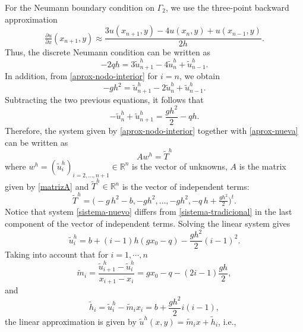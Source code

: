 \documentclass[axioms,article,submit,moreauthors]{Definitions/mdpi}
\newcommand\pder[2][]{\ensuremath{\tfrac{\partial#1}{\partial#2}}}
\begin{document}
For the Neumann boundary condition on $\Gamma_2$, we use the three-point backward \mbox{approximation}
\begin{equation}\label{aprox-Neumann-nueva}
\pder[u]{x}(x_{n+1},y)\approx \frac{3u(x_{n+1},y)-4u(x_n,y)+u(x_{n-1},y)}{2h}.
\end{equation}
Thus, the discrete Neumann condition can be written as
\begin{equation}
-2 q h = {
3\widetilde{u}^{h}_{n+1}
-4\widetilde{u}^{h}_{n}
+\widetilde{u}^{h}_{n-1}}.
\end{equation}
In addition, from \eqref{aprox-nodo-interior} for $i=n$, we obtain
\begin{equation}
-gh^2 = {\widetilde{u}^h_{n+1}-2\widetilde{u}^h_n+\widetilde{u}^h_{n-1}.}
\end{equation}
Subtracting the two previous equations, it follows that
\begin{equation}\label{aprox-nueva}
{-\widetilde{u}^h_n+\widetilde{u}^h_{n+1}}=\frac{gh^2}{2}-qh.
\end{equation}
Therefore, the system given by \eqref{aprox-nodo-interior} together with \eqref{aprox-nueva} can be written  as
\begin{equation}\label{sistema-nuevo}
{A w^h=\widetilde{T}^h}
\end{equation}
where $w^h = ({\widetilde{u}^h_i})_{i=2,\ldots,n+1}\in\mathbb{R}^{n}$ is the vector of unknowns, $A$ is the matrix given by \eqref{matrizA} and   ${\widetilde{T}^h}\in \mathbb{R}^n$ is the vector of independent terms:
    \begin{equation}\label{vectorT*}
     {\widetilde{T}^h}= \Big(-g\,h^2 - b, -g h^2, \ldots, -g h^2, -q\,h +\tfrac{gh^2}{2} \Big)^t.
\end{equation}
Notice that system \eqref{sistema-nuevo} differs from \eqref{sistema-tradicional} in the last component of the vector of independent terms.
Solving the linear system gives
\begin{equation}
{\widetilde{u}^h_i}=b+(i-1)h(gx_0-q)-\frac{gh^2}{2}(i-1)^2.
\end{equation}
Taking into account that for $i=1,\cdots, n$
\begin{equation}
\widetilde{m}_i={\frac{\widetilde{u}^h_{i+1}-\widetilde{u}^h_{i}}{x_{i+1}-x_i}}=gx_0-q-(2i-1)\frac{gh}{2},
\end{equation}
and
\begin{equation}
\widetilde{h}_i= {\widetilde{u}^h_i-\widetilde{m}_i x_i}= b+\frac{gh^2}{2} i (i-1),
\end{equation}
the linear approximation is given by ${\widetilde{u}^h}(x,y)=\widetilde{m}_i x+\widetilde{h}_i$, i.e.,
\end{document}
